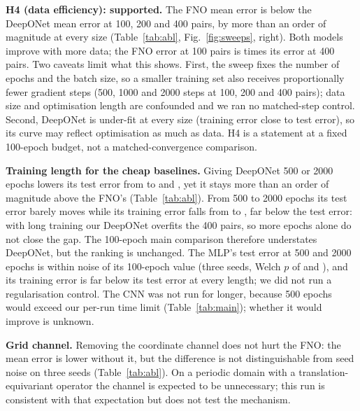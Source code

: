 \textbf{H4 (data efficiency): supported.} The FNO mean error is below the DeepONet mean error at 100, 200 and 400 pairs, by more than an order of magnitude at every size (Table~\ref{tab:abl}, Fig.~\ref{fig:sweeps}, right). Both models improve with more data; the FNO error at 100 pairs is  times its error at 400 pairs. Two caveats limit what this shows. First, the sweep fixes the number of epochs and the batch size, so a smaller training set also receives proportionally fewer gradient steps (500, 1000 and 2000 steps at 100, 200 and 400 pairs); data size and optimisation length are confounded and we ran no matched-step control. Second, DeepONet is under-fit at every size (training error close to test error), so its curve may reflect optimisation as much as data. H4 is a statement at a fixed 100-epoch budget, not a matched-convergence comparison.

\textbf{Training length for the cheap baselines.} Giving DeepONet 500 or 2000 epochs lowers its test error from  to  and , yet it stays more than an order of magnitude above the FNO's (Table~\ref{tab:abl}). From 500 to 2000 epochs its test error barely moves while its training error falls from  to , far below the test error: with long training our DeepONet overfits the 400 pairs, so more epochs alone do not close the gap. The 100-epoch main comparison therefore understates DeepONet, but the ranking is unchanged. The MLP's test error at 500 and 2000 epochs is within noise of its 100-epoch value (three seeds, Welch $p$ of  and ), and its training error is far below its test error at every length; we did not run a regularisation control. The CNN was not run for longer, because 500 epochs would exceed our per-run time limit (Table~\ref{tab:main}); whether it would improve is unknown.

\textbf{Grid channel.} Removing the coordinate channel does not hurt the FNO: the mean error is lower without it, but the difference is not distinguishable from seed noise on three seeds (Table~\ref{tab:abl}). On a periodic domain with a translation-equivariant operator the channel is expected to be unnecessary; this run is consistent with that expectation but does not test the mechanism.
